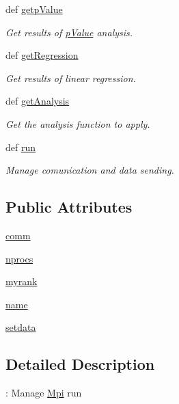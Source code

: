 \begin{DoxyCompactItemize}
def \hyperlink{classirna_1_1iRNA__stat_1_1Mpi_1_1Mpi_adabb6b48eb531f91f0ac9a18b4d56a95}{getp\-Value}
\begin{DoxyCompactList}\small\item\em \-Get results of \hyperlink{namespaceirna_1_1iRNA__stat_1_1pValue}{p\-Value} analysis. \end{DoxyCompactList}\item 
def \hyperlink{classirna_1_1iRNA__stat_1_1Mpi_1_1Mpi_a9cd4977f1de5c0de613103412c5c1727}{get\-Regression}
\begin{DoxyCompactList}\small\item\em \-Get results of linear regression. \end{DoxyCompactList}\item 
def \hyperlink{classirna_1_1iRNA__stat_1_1Mpi_1_1Mpi_a649a85fc1553b835094a744e483e91c3}{get\-Analysis}
\begin{DoxyCompactList}\small\item\em \-Get the analysis function to apply. \end{DoxyCompactList}\item 
def \hyperlink{classirna_1_1iRNA__stat_1_1Mpi_1_1Mpi_a7371683c402d44460cb9f961fd94fdd2}{run}
\begin{DoxyCompactList}\small\item\em \-Manage comunication and data sending. \end{DoxyCompactList}\end{DoxyCompactItemize}
\subsection*{\-Public \-Attributes}
\begin{DoxyCompactItemize}
\item 
\hyperlink{classirna_1_1iRNA__stat_1_1Mpi_1_1Mpi_af39df0befb8ac45338cf33809722bab3}{comm}
\item 
\hyperlink{classirna_1_1iRNA__stat_1_1Mpi_1_1Mpi_a9f7dea6fcff8aa117ab7837fbe95d388}{nprocs}
\item 
\hyperlink{classirna_1_1iRNA__stat_1_1Mpi_1_1Mpi_a5088938f62a991328c382b192a2440d4}{myrank}
\item 
\hyperlink{classirna_1_1iRNA__stat_1_1Mpi_1_1Mpi_a98b240c4e4c4d6dc2afba97a6a5897b0}{name}
\item 
\hyperlink{classirna_1_1iRNA__stat_1_1Mpi_1_1Mpi_ad47348b2098c045c3a7fbe01ed129f0a}{setdata}
\end{DoxyCompactItemize}


\subsection{\-Detailed \-Description}
\-: \-Manage \hyperlink{classirna_1_1iRNA__stat_1_1Mpi_1_1Mpi}{\-Mpi} run 

